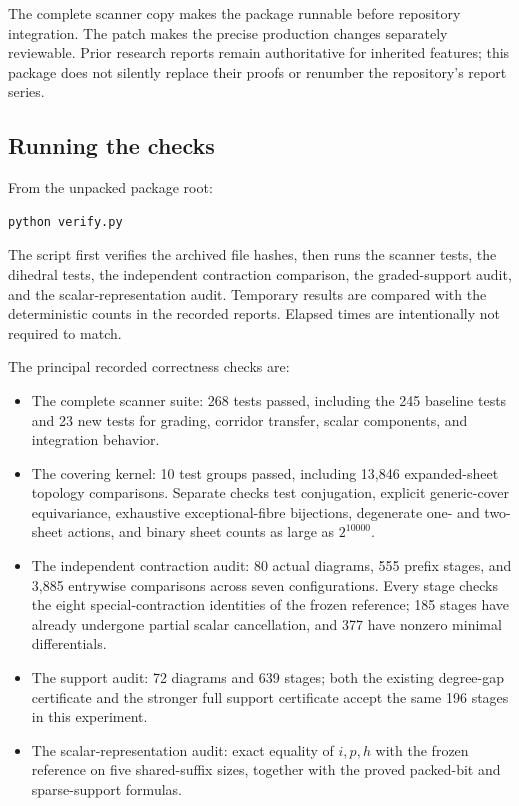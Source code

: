 The complete scanner copy makes the package runnable before repository
integration. The patch makes the precise production changes separately
reviewable. Prior research reports remain authoritative for inherited
features; this package does not silently replace their proofs or
renumber the repository's report series.

\subsection{Running the checks}

From the unpacked package root:
\begin{lstlisting}
python verify.py
\end{lstlisting}
The script first verifies the archived file hashes, then runs the scanner
tests, the dihedral tests, the independent contraction comparison, the
graded-support audit, and the scalar-representation audit. Temporary
results are compared with the deterministic counts in the recorded
reports. Elapsed times are intentionally not required to match.

The principal recorded correctness checks are:
\begin{itemize}
\item The complete scanner suite: 268 tests passed, including the 245
baseline tests and 23 new tests for grading, corridor transfer, scalar
components, and integration behavior.
\item The covering kernel: 10 test groups passed, including 13,846
expanded-sheet topology comparisons. Separate checks test conjugation,
explicit generic-cover equivariance, exhaustive exceptional-fibre
bijections, degenerate one- and two-sheet actions, and binary sheet
counts as large as $2^{10000}$.
\item The independent contraction audit: 80 actual diagrams, 555 prefix
stages, and 3,885 entrywise comparisons across seven configurations.
Every stage checks the eight special-contraction identities of the
frozen reference; 185 stages have already undergone partial scalar
cancellation, and 377 have nonzero minimal differentials.
\item The support audit: 72 diagrams and 639 stages; both the existing
degree-gap certificate and the stronger full support certificate
accept the same 196 stages in this experiment.
\item The scalar-representation audit: exact equality of $i,p,h$ with
the frozen reference on five shared-suffix sizes, together with the
proved packed-bit and sparse-support formulas.
\end{itemize}

